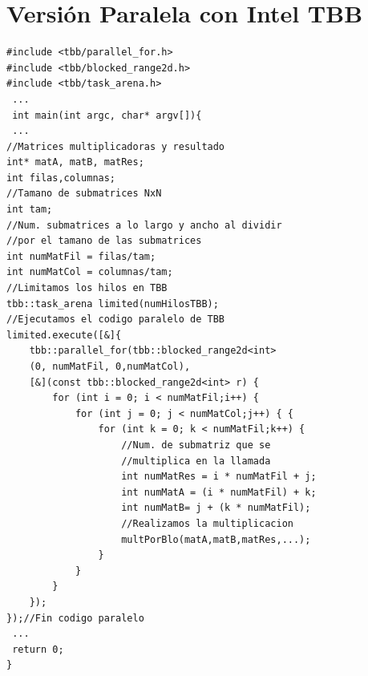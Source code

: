 \documentclass[a4paper,12pt]{article}
\begin{document}
\section{Versión Paralela con Intel TBB} \label{app:A}
\begin{lstlisting}
#include <tbb/parallel_for.h>
#include <tbb/blocked_range2d.h>
#include <tbb/task_arena.h>
 ...
 int main(int argc, char* argv[]){
 ...
//Matrices multiplicadoras y resultado
int* matA, matB, matRes;
int filas,columnas;
//Tamano de submatrices NxN
int tam;
//Num. submatrices a lo largo y ancho al dividir 
//por el tamano de las submatrices
int numMatFil = filas/tam;
int numMatCol = columnas/tam;
//Limitamos los hilos en TBB
tbb::task_arena limited(numHilosTBB); 
//Ejecutamos el codigo paralelo de TBB
limited.execute([&]{
    tbb::parallel_for(tbb::blocked_range2d<int>
    (0, numMatFil, 0,numMatCol),
    [&](const tbb::blocked_range2d<int> r) {
        for (int i = 0; i < numMatFil;i++) {
            for (int j = 0; j < numMatCol;j++) { {
                for (int k = 0; k < numMatFil;k++) {
                    //Num. de submatriz que se 
                    //multiplica en la llamada
                    int numMatRes = i * numMatFil + j;
                    int numMatA = (i * numMatFil) + k;
                    int numMatB= j + (k * numMatFil);
                    //Realizamos la multiplicacion
                    multPorBlo(matA,matB,matRes,...);
                }
            }
        }
    });
});//Fin codigo paralelo
 ...
 return 0;
}

\end{lstlisting}


\newpage
\end{document}
